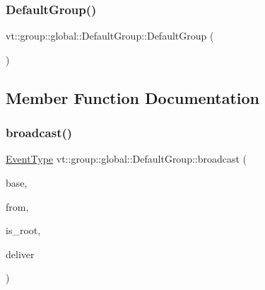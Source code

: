 \subsubsection{\texorpdfstring{Default\+Group()}{DefaultGroup()}}
{\footnotesize\ttfamily vt\+::group\+::global\+::\+Default\+Group\+::\+Default\+Group (\begin{DoxyParamCaption}{ }\end{DoxyParamCaption})\hspace{0.3cm}{\ttfamily [default]}}



\subsection{Member Function Documentation}
\mbox{\label{structvt_1_1group_1_1global_1_1_default_group_aabe308609533b1a788516f4ff984be18}} 
\subsubsection{\texorpdfstring{broadcast()}{broadcast()}}
{\footnotesize\ttfamily \hyperlink{namespacevt_a009267401def7ae8bf201892222d060f}{Event\+Type} vt\+::group\+::global\+::\+Default\+Group\+::broadcast (\begin{DoxyParamCaption}\item[{\hyperlink{namespacevt_ab2b3d506ec8e8d1540aede826d84a239}{Msg\+Shared\+Ptr}$<$ \hyperlink{namespacevt_a44d0d4e144748f2b19a1cfd962f50338}{Base\+Msg\+Type} $>$ const \&}]{base,  }\item[{\hyperlink{namespacevt_a866da9d0efc19c0a1ce79e9e492f47e2}{Node\+Type} const \&}]{from,  }\item[{bool const}]{is\+\_\+root,  }\item[{bool $\ast$const}]{deliver }\end{DoxyParamCaption})\hspace{0.3cm}{\ttfamily [static]}}

\mbox{\label{structvt_1_1group_1_1global_1_1_default_group_a2f503c7d6615e558ce08b0de7a1e8bfa}} 
